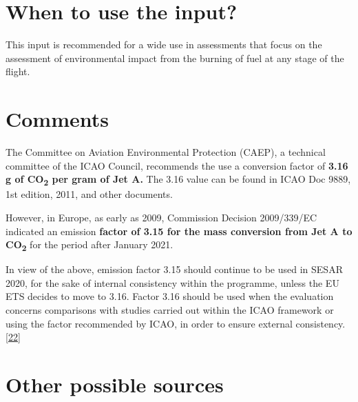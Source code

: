 \documentclass[
  11pt,
  a4paper,
]{book}
\begin{document}
\hypertarget{when-to-use-the-input-3}{%
\section{When to use the input?}\label{when-to-use-the-input-3}}

This input is recommended for a wide use in assessments that focus on
the assessment of environmental impact from the burning of fuel at any
stage of the flight.

\hypertarget{comments-2}{%
\section{Comments}\label{comments-2}}

The Committee on Aviation Environmental Protection (CAEP), a technical
committee of the ICAO Council, recommends the use a conversion factor of
\textbf{3.16 g of CO\textsubscript{2} per gram of Jet A.} The 3.16 value
can be found in ICAO Doc 9889, 1st edition, 2011, and other documents.

However, in Europe, as early as 2009, Commission Decision 2009/339/EC
indicated an emission \textbf{factor of 3.15 for the mass conversion
from Jet A to CO\textsubscript{2}} for the period after January 2021.

In view of the above, emission factor 3.15 should continue to be used in
SESAR 2020, for the sake of internal consistency within the programme,
unless the EU ETS decides to move to 3.16. Factor 3.16 should be used
when the evaluation concerns comparisons with studies carried out within
the ICAO framework or using the factor recommended by ICAO, in order to
ensure external
consistency.\protect\hyperlink{ref-SESAR2020Environment}{{[}22{]}}

\hypertarget{other-possible-sources-1}{%
\section{Other possible sources}\label{other-possible-sources-1}}
\end{document}
